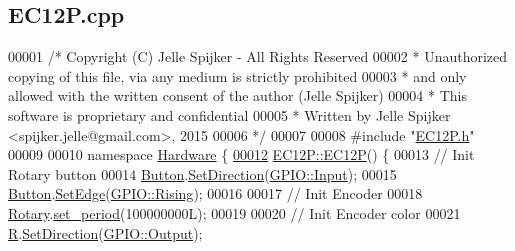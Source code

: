 \hypertarget{_e_c12_p_8cpp_source}{}\subsection{E\+C12\+P.\+cpp}
\label{_e_c12_p_8cpp_source}

\begin{DoxyCode}
00001 \textcolor{comment}{/* Copyright (C) Jelle Spijker - All Rights Reserved}
00002 \textcolor{comment}{ * Unauthorized copying of this file, via any medium is strictly prohibited}
00003 \textcolor{comment}{ * and only allowed with the written consent of the author (Jelle Spijker)}
00004 \textcolor{comment}{ * This software is proprietary and confidential}
00005 \textcolor{comment}{ * Written by Jelle Spijker <spijker.jelle@gmail.com>, 2015}
00006 \textcolor{comment}{ */}
00007 
00008 \textcolor{preprocessor}{#include "\hyperlink{_e_c12_p_8h}{EC12P.h}"}
00009 
00010 \textcolor{keyword}{namespace }\hyperlink{namespace_hardware}{Hardware} \{
\hypertarget{_e_c12_p_8cpp_source_l00012}{}\hyperlink{class_hardware_1_1_e_c12_p_a0b5c45d061ad98239e816e3845535d15}{00012} \hyperlink{class_hardware_1_1_e_c12_p_a0b5c45d061ad98239e816e3845535d15}{EC12P::EC12P}() \{
00013   \textcolor{comment}{// Init Rotary button}
00014   \hyperlink{class_hardware_1_1_e_c12_p_a6d91a7b1767f080af8c33bacdae1dd1d}{Button}.\hyperlink{class_hardware_1_1_g_p_i_o_a4a9fc2f7be304a6b23c2a2876b4c6bf9}{SetDirection}(\hyperlink{class_hardware_1_1_g_p_i_o_a7507431d6341c146f22dcdb21b78ffd4a5614339496b61db558bd9a26a327088e}{GPIO::Input});
00015   \hyperlink{class_hardware_1_1_e_c12_p_a6d91a7b1767f080af8c33bacdae1dd1d}{Button}.\hyperlink{class_hardware_1_1_g_p_i_o_a4d4ab3b0f1ee53590a300bfbcccae895}{SetEdge}(\hyperlink{class_hardware_1_1_g_p_i_o_a9a7595aabdac9aec75f22e8b86342162afbb0aadc6c0311beb25d5a056c61ed46}{GPIO::Rising});
00016 
00017   \textcolor{comment}{// Init Encoder}
00018   \hyperlink{class_hardware_1_1_e_c12_p_abfe8d6ea8948c77d4866ca8a05dbebe9}{Rotary}.\hyperlink{class_hardware_1_1e_q_e_p_ab8b1babd8dc96f5052be96ed6e65e111}{set\_period}(100000000L);
00019 
00020   \textcolor{comment}{// Init Encoder color}
00021   \hyperlink{class_hardware_1_1_e_c12_p_a0a4f03a37d709349994e800e44f5c781}{R}.\hyperlink{class_hardware_1_1_g_p_i_o_a4a9fc2f7be304a6b23c2a2876b4c6bf9}{SetDirection}(\hyperlink{class_hardware_1_1_g_p_i_o_a7507431d6341c146f22dcdb21b78ffd4a72432a9b39a6e45297b1158da8bb60eb}{GPIO::Output});

\end{DoxyCode}
